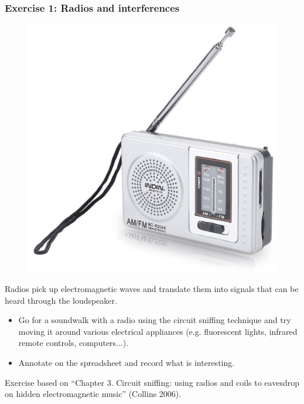 \documentclass[screen, aspectratio=43]{beamer}
\begin{document}
\begin{frame}
  \frametitle{Exercise 1: Radios and interferences}
   \begin{figure}
	\includegraphics[scale=0.09]{img/battery-powered-radio.jpg}
\end{figure}
{\scriptsize 
Radios pick up electromagnetic waves and translate them into signals that can be heard through the loudspeaker.
    \begin{itemize}
	\item Go for a soundwalk with a radio using the circuit sniffing technique and try moving it around various electrical appliances (e.g. fluorescent lights, infrared remote controls, computers...).
	\item Annotate on the spreadsheet and record what is interesting.
    \end{itemize}   
}    
{\tiny
Exercise based on ``Chapter 3. Circuit sniffing: using radios and coils to eavesdrop on hidden electromagnetic music'' (Collins 2006).
}
\end{frame}
%
\end{document}
